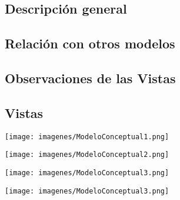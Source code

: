 \subsection{Descripción general}

\subsection{Relación con otros modelos}

\subsection{Observaciones de las Vistas}


\newpage
\subsection{Vistas}
\begin{center}
\texttt{[image: imagenes/ModeloConceptual1.png]}
\end{center}

\newpage
\begin{center}
\texttt{[image: imagenes/ModeloConceptual2.png]}
\end{center}

\newpage
\begin{center}
\texttt{[image: imagenes/ModeloConceptual3.png]}
\end{center}

\newpage
\begin{center}
\texttt{[image: imagenes/ModeloConceptual3.png]}
\end{center}
